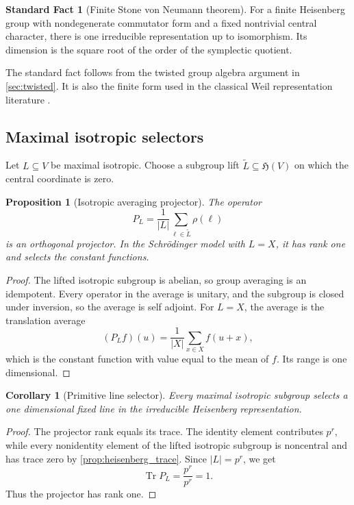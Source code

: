 \documentclass[11pt]{amsart}
\newtheorem{proposition}[proposition]{Proposition}
\newtheorem{corollary}[corollary]{Corollary}
\theoremstyle{definition}
\newtheorem{standardfact}[standardfact]{Standard Fact}
\theoremstyle{remark}
\newcommand{\Tr}{\operatorname{Tr}}
\newcommand{\abs}[1]{\left\lvert#1\right\rvert}
\newcommand{\frakH}{\mathfrak H}
\begin{document}
\begin{standardfact}[Finite Stone von Neumann theorem]\label{fact:stone_von_neumann}
For a finite Heisenberg group with nondegenerate commutator form and a fixed nontrivial central character, there is one irreducible representation up to isomorphism. Its dimension is the square root of the order of the symplectic quotient.
\end{standardfact}

The standard fact follows from the twisted group algebra argument in \cref{sec:twisted}. It is also the finite form used in the classical Weil representation literature \cite{Gerardin1977,Prasad2009}.

\subsection{Maximal isotropic selectors}

Let \(L\subseteq V\) be maximal isotropic. Choose a subgroup lift \(\widetilde L\subseteq\frakH(V)\) on which the central coordinate is zero.

\begin{proposition}[Isotropic averaging projector]\label{prop:isotropic_selector}
The operator
\[
P_L
=
\frac1{\abs L}
\sum_{\ell\in\widetilde L}
\rho(\ell)
\]
is an orthogonal projector. In the Schrödinger model with \(L=X\), it has rank one and selects the constant functions.
\end{proposition}

\begin{proof}
The lifted isotropic subgroup is abelian, so group averaging is an idempotent. Every operator in the average is unitary, and the subgroup is closed under inversion, so the average is self adjoint. For \(L=X\), the average is the translation average
\[
(P_Lf)(u)
=
\frac1{\abs X}
\sum_{x\in X}f(u+x),
\]
which is the constant function with value equal to the mean of \(f\). Its range is one dimensional.
\end{proof}

\begin{corollary}[Primitive line selector]\label{cor:primitive_selector}
Every maximal isotropic subgroup selects a one dimensional fixed line in the irreducible Heisenberg representation.
\end{corollary}

\begin{proof}
The projector rank equals its trace. The identity element contributes \(p^r\), while every nonidentity element of the lifted isotropic subgroup is noncentral and has trace zero by \cref{prop:heisenberg_trace}. Since \(\abs L=p^r\), we get
\[
\Tr P_L
=
\frac{p^r}{p^r}=1.
\]
Thus the projector has rank one.
\end{proof}
\end{document}
